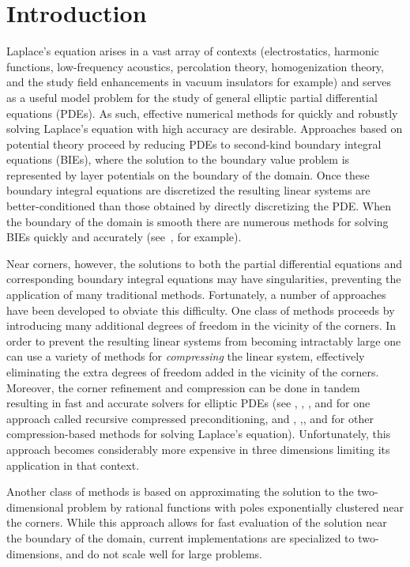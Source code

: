 \section{Introduction}
Laplace's equation arises in a vast array of contexts (electrostatics, harmonic functions, low-frequency acoustics, percolation theory, homogenization theory, and the study field enhancements in vacuum insulators for example) and serves as a useful model problem for the study of general elliptic partial differential equations (PDEs). As such, effective numerical methods for quickly and robustly solving Laplace's equation with high accuracy are desirable. Approaches based on potential theory proceed by reducing PDEs to second-kind boundary integral equations (BIEs), where the solution to the boundary value problem is represented by layer potentials on the boundary of the domain. Once these boundary integral equations are discretized the resulting linear systems are better-conditioned than those obtained by directly discretizing the PDE. When the boundary of the domain is smooth there are numerous methods for solving BIEs quickly and accurately (see~\cite{hao}, for example). 

Near corners, however, the solutions to both the partial differential equations and corresponding boundary integral equations may have singularities, preventing the application of many traditional methods. Fortunately, a number of approaches have been developed to obviate this difficulty. One class of methods proceeds by introducing many additional degrees of freedom in the vicinity of the corners. In order to prevent the resulting linear systems from becoming intractably large one can use a variety of methods for {\it compressing} the linear system, effectively eliminating the extra degrees of freedom added in the vicinity of the corners. Moreover, the corner refinement and compression can be done in tandem resulting in fast and accurate solvers for elliptic PDEs (see \cite{helsing}, \cite{helsing2},  \cite{ojala}, \cite{helsjcp} and \cite{helsinv}  for  one approach called recursive compressed preconditioning, and  \cite{gillman}, \cite{bremer},\cite{bremer2}, and \cite{bremer3}  for other compression-based methods for solving Laplace's equation). Unfortunately, this approach becomes considerably more expensive in three dimensions limiting its application in that context.

 Another class of methods is based on approximating the solution to the two-dimensional problem by rational functions \cite{gopal2019solving} with poles exponentially clustered near the corners. While this approach allows for fast evaluation of the solution near the boundary of the domain, current implementations are specialized to two-dimensions, and do not scale well  for large problems.
 
